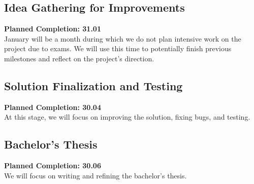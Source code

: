 \documentclass[12pt]{article}
\begin{document}
\subsection*{Idea Gathering for Improvements}
\textbf{Planned Completion: 31.01}\\
January will be a month during which we do not plan intensive work on the project due to exams. We will use this time to potentially finish previous milestones and reflect on the project's direction.

\subsection*{Solution Finalization and Testing}
\textbf{Planned Completion: 30.04}\\
At this stage, we will focus on improving the solution, fixing bugs, and testing.

\subsection*{Bachelor's Thesis}
\textbf{Planned Completion: 30.06}\\
We will focus on writing and refining the bachelor's thesis.



\end{document}
